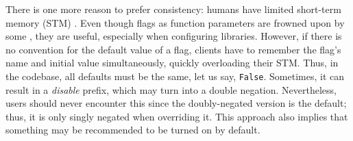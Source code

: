 There is one more reason to prefer consistency: humans have limited short-term memory (STM) \cite{miller1956magical}. Even though flags as function parameters are frowned upon by some \cite{martin2009clean}, they are useful, especially when configuring libraries. However, if there is no convention for the default value of a flag, clients have to remember the flag's name and initial value simultaneously, quickly overloading their STM. Thus, in the codebase, all defaults must be the same, let us say, \texttt{False}. Sometimes, it can result in a \textit{disable} prefix, which may turn into a double negation. Nevertheless, users should never encounter this since the doubly-negated version is the default; thus, it is only singly negated when overriding it. This approach also implies that something may be recommended to be turned on by default.
